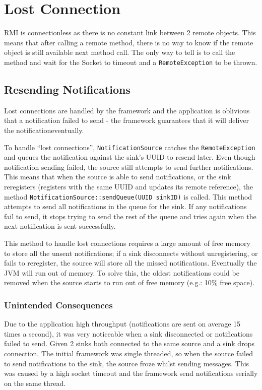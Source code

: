 \documentclass[a4paper]{article}
\begin{document}
\section{Lost Connection}\label{sec:lost_conns}
RMI is connectionless as there is no constant link between 2 remote objects.
This means that after calling a remote method, there is no way to know if the remote object is still available next method call.
The only way to tell is to call the method and wait for the Socket to timeout and a \texttt{RemoteException} to be thrown.

\subsection{Resending Notifications}
Lost connections are handled by the framework and the application is oblivious that a notification failed to send - the framework guarantees that it will deliver the notification\textellipsis eventually.

To handle ``lost connections'', \texttt{NotificationSource} catches the \texttt{RemoteException} and queues the notification against the sink's UUID to resend later.
Even though notification sending failed, the source still attempts to send further notifications.
This means that when the source is able to send notifications, or the sink reregisters (registers with the same UUID and updates its remote reference),
the method \texttt{NotificationSource::sendQueue(UUID sinkID)} is called.
This method attempts to send all notifications in the queue for the sink.
If any notifications fail to send, it stops trying to send the rest of the queue and tries again when the next notification is sent successfully.

This method to handle lost connections requires a large amount of free memory to store all the unsent notifications;
 if a sink disconnects without unregistering, or fails to reregister, the source will store all the missed notifications.
Eventually the JVM will run out of memory.
To solve this, the oldest notifications could be removed when the source starts to run out of free memory (e.g.: 10\% free space).

\subsubsection{Unintended Consequences}
Due to the application high throughput (notifications are sent on average 15 times a second), it was very noticeable when a sink disconnected or notifications failed to send.
Given 2 sinks both connected to the same source and a sink drops connection.
The initial framework was single threaded, so when the source failed to send notifications to the sink, the source froze whilst sending messages.
This was caused by a high socket timeout and the framework send notifications serially on the same thread.
\end{document}
